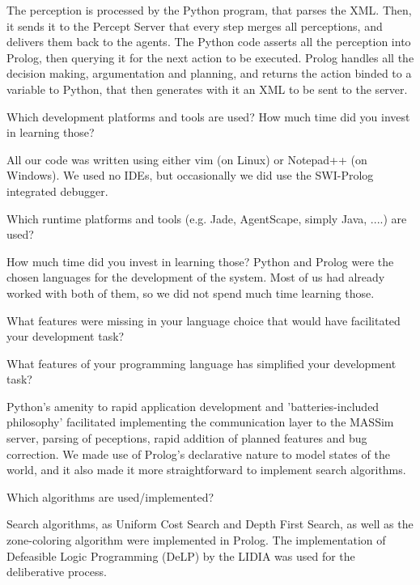 The perception is processed by the Python program, that parses the XML. Then, it
sends it to the Percept Server that every step merges all perceptions, and
delivers them back to the agents.  The Python code asserts all the perception
into Prolog, then querying it for the next action to be executed.  Prolog
handles all the decision making, argumentation and planning, and returns the
action binded to a variable to Python, that then generates with it an XML to be
sent to the server.

\begin{question}
Which development platforms and tools are used? How much time did you invest in
learning those?  
\end{question}

All our code was written using either vim (on Linux) or Notepad++ (on Windows).
We used no IDEs, but occasionally we did use the SWI-Prolog integrated debugger.

\begin{question}
Which runtime platforms and tools (e.g. Jade, AgentScape, simply Java, ....) are
used? 
\end{question}

How much time did you invest in learning those?  Python and Prolog were the
chosen languages for the development of the system. Most of us had already
worked with both of them, so we did not spend much time learning those.

\begin{question}
What features were missing in your language choice that would have facilitated
your development task?
\end{question}

\begin{question}
What features of your programming language has simplified your development
task?  
\end{question}

Python's amenity to rapid application development and 'batteries-included
philosophy' facilitated implementing the communication layer to the MASSim
server, parsing of peceptions, rapid addition of planned features and bug
correction.  We made use of Prolog's declarative nature to model states of the
world, and it also made it more straightforward to implement search algorithms.

\begin{question}
Which algorithms are used/implemented?  
\end{question}

Search algorithms, as Uniform Cost Search and Depth First Search, as well as the
zone-coloring algorithm were implemented in Prolog.  The implementation of
Defeasible Logic Programming (DeLP) by the LIDIA was used for the deliberative
process.

